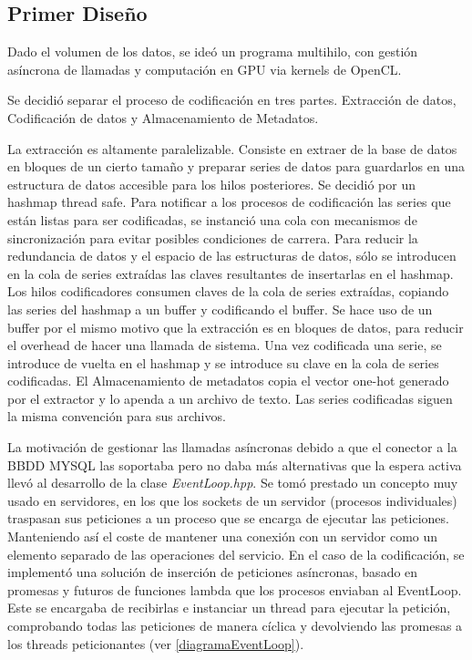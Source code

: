 \subsection{Primer Diseño}
Dado el volumen de los datos, se ideó un programa multihilo, con gestión asíncrona de llamadas y computación en GPU via kernels de OpenCL.

Se decidió separar el proceso de codificación en tres partes. Extracción de datos, Codificación de datos y Almacenamiento de Metadatos.

La extracción es altamente paralelizable. Consiste en extraer de la base de datos en bloques de un cierto tamaño y preparar series de datos para guardarlos en una estructura de datos accesible para los hilos posteriores. Se decidió por un hashmap thread safe.
Para notificar a los procesos de codificación las series que están listas para ser codificadas, se instanció una cola con mecanismos de sincronización para evitar posibles condiciones de carrera. Para reducir la redundancia de datos y el espacio de las estructuras de datos, sólo se introducen en la cola de series extraídas las claves resultantes de insertarlas en el hashmap.
Los hilos codificadores consumen claves de la cola de series extraídas, copiando las series del hashmap a un buffer y codificando el buffer. Se hace uso de un buffer por el mismo motivo que la extracción es en bloques de datos, para reducir el overhead de hacer una llamada de sistema. Una vez codificada una serie, se introduce de vuelta en el hashmap y se introduce su clave en la cola de series codificadas.
El Almacenamiento de metadatos copia el vector one-hot generado por el extractor y lo apenda a un archivo de texto. Las series codificadas siguen la misma convención para sus archivos. 

La motivación de gestionar las llamadas asíncronas debido a que el conector a la BBDD MYSQL las soportaba pero no daba más alternativas que la espera activa llevó al desarrollo de la clase \textit{EventLoop.hpp}. Se tomó prestado un concepto muy usado en servidores, en los que los sockets de un servidor (procesos individuales) traspasan sus peticiones a un proceso que se encarga de ejecutar las peticiones. Manteniendo así el coste de mantener una conexión con un servidor como un elemento separado de las operaciones del servicio. 
En el caso de la codificación, se implementó una solución de inserción de peticiones asíncronas, basado en promesas y futuros de funciones lambda que los procesos enviaban al EventLoop. Este se encargaba de recibirlas e instanciar un thread para ejecutar la petición, comprobando todas las peticiones de manera cíclica y devolviendo las promesas a los threads peticionantes (ver \ref{diagramaEventLoop}). 

